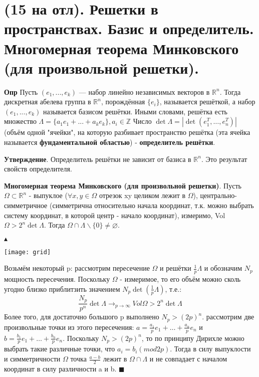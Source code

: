 \setcounter{section}{98}
\section{(15 на отл). Решетки в пространствах. Базис и определитель. Многомерная теорема Минковского (для произвольной решетки).}

\textbf{Опр} Пусть $( e_1, . . . , e_k)$ — набор линейно независимых векторов в $\mathbb{R}^n$. Тогда дискретная абелева группа в $\mathbb{R}^n$, порождённая $\{e_i\}$, называется решёткой, а набор $( e_1, . . . , e_k)$ называется базисом решётки. Иными словами, решётка есть множество $\Lambda = \{a_1 e_1 + ... + a_k e_k\}, a_i \in \mathbb{Z}$ Число $\det \Lambda = |\det(e_1^T, \dots, e_n^T)|$ (объём одной "ячейки", на которую разбивает пространство решётка (эта ячейка называется \textbf{фундаментальной областью}) - \textbf{определитель решётки}. \par
\textbf{Утверждение}. Определитель решётки не зависит от базиса в $\mathbb{R}^n$. Это результат свойств определителя.

\textbf{Многомерная теорема Минковского (для произвольной решетки)}. Пусть $\Omega \subset \mathbb{R}^n$ - выпуклое ($\forall x, y \in \Omega$ отрезок xy целиком лежит в $\Omega$), центрально-симметричное (симметрична относительно начала координат, т.к. можно выбрать систему координат, в которой центр - начало координат), измеримо, Vol$\Omega > 2^n \det \Lambda$. Тогда $\Omega \cap \Lambda \backslash \{0\} \neq \varnothing$. \par
$\blacktriangle$ \par
\texttt{[image: grid]} \par
Возьмём некоторый p: рассмотрим пересечение $\Omega$ и решётки $\frac{1}{p}\Lambda$ и обозначим $N_p$ мощность пересечения. Поскольку $\Omega$ - измеримое, то его объём можно сколь угодно близко приблитзить значением $N_p\det(\frac{1}{p}\Lambda)$, т.е.: \[
\frac{N_p}{p^n}\det\Lambda \to_{p \to \infty} Vol \Omega > 2^n \det \Lambda
\]
Более того, для достаточно большого p выполнено $N_p > (2p)^n$. рассмотрим две произвольные точки из этого пересечения: $a = \frac{a_1}{p}e_1 + \dots + \frac{a_n}{p}e_n$ и $b = \frac{b_1}{p}e_1 + \dots + \frac{b_n}{p}e_n$. Поскольку $N_p > (2p)^n$, то по принципу Дирихле можно выбрать такие различные точки, что $a_i = b_i (mod 2p)$. Тогда в силу выпуклости и симметричности $\Omega$ точка $\frac{a - b}{2}$ лежит в $\Omega \cap \Lambda$ и не совпадает с началом координат в силу различности a и b.
$\blacksquare$